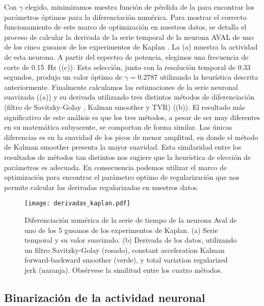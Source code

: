 Con $\gamma$ elegido, minimizamos nuestra función de pérdida de la  para encontrar los parámetros óptimos para la diferenciación numérica.   Para mostrar el correcto  funcionamiento de este marco de optimización  en nuestros datos,  se detalla  el proceso de calcular la derivada   de la serie temporal de la neurona AVAL de uno de los cinco gusanos de los experimentos de Kaplan \cite{kaplan_nested_2020}.  La  (a) muestra la actividad de esta neurona. A partir del espectro de potencia, elegimos una frecuencia de corte de   \qty{0.15}{\hertz} ((c)). Esta selección, junto con la resolución temporal de $0.33$ segundos, produjo un valor óptimo de $\gamma=0.2787$ utilizando la  heurística descrita anteriormente.  Finalmente calculamos las estimaciones de la serie neuronal suavizada ((a))   y su derivada utilizando   tres distintos métodos de diferenciación (filtro de Savitzky-Golay , Kalman smoother y  TVR) ((b)). El resultado más significativo de este análisis es que los tres métodos, a pesar de ser muy diferentes en su matemática subyacente, se comportan de forma similar. Las únicas diferencias es en la suavidad de los picos de menor amplitud,  en  donde el método de Kalman smoother presenta la mayor suavidad. Esta similaridad entre los resultados de métodos tan distintos nos sugiere que la heurística de elección de parámetros es adecuada. En consecuencia podemos utilizar el marco de optimización para encontrar el parámetro optimo de regularización que nos permite calcular   las derivadas  regularizadas en nuestros datos. 


\begin{figure}[h!]
	\centering{}\texttt{[image: derivadas\_kaplan.pdf]}
	\caption[Diferenciación numérica de la serie de tiempo de la neurona Aval de uno de los 5 gusanos de los experimentos de Kaplan.]{Diferenciación numérica de la serie de tiempo de la neurona Aval de uno de los 5 gusanos de los experimentos de Kaplan. (a) Serie temporal  y su valor  suavizado. (b) Derivada de los datos, utilizando un filtro Savitzky-Golay (rosado), constant acceleration Kalman forward-backward smoother  (verde), y total variation regularized jerk (naranja). Obsérvese la similitud entre los cuatro métodos.}\label{f:derivada_kaplan}  
\end{figure}


\subsection{Binarización de la actividad neuronal}

